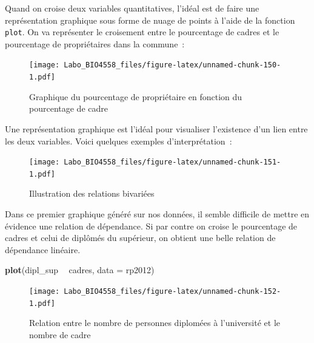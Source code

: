 \documentclass[12pt,]{book}
\newenvironment{Shaded}{\begin{snugshade}}{\end{snugshade}}
\newcommand{\DataTypeTok}[1]{\textcolor[rgb]{0.27,0.27,0.27}{#1}}
\newcommand{\KeywordTok}[1]{\textcolor[rgb]{0.27,0.27,0.27}{\textbf{#1}}}
\newcommand{\NormalTok}[1]{#1}
\newcommand{\OperatorTok}[1]{\textcolor[rgb]{0.43,0.43,0.43}{\textbf{#1}}}
\newcommand{\StringTok}[1]{\textcolor[rgb]{0.5,0.5,0.5}{#1}}
\begin{document}
Quand on croise deux variables quantitatives, l'idéal est de faire une représentation graphique sous forme de nuage de points à l'aide de la fonction \texttt{plot}. On va représenter le croisement entre le pourcentage de cadres et le pourcentage de propriétaires dans la commune~:

\begin{Shaded}
\end{Shaded}

\begin{figure}
\centering
\texttt{[image: Labo\_BIO4558\_files/figure-latex/unnamed-chunk-150-1.pdf]}
\caption{\label{fig:unnamed-chunk-150}Graphique du pourcentage de propriétaire en fonction du pourcentage de cadre}
\end{figure}

Une représentation graphique est l'idéal pour visualiser l'existence d'un lien entre les deux variables. Voici quelques exemples d'interprétation~:

\begin{figure}
\centering
\texttt{[image: Labo\_BIO4558\_files/figure-latex/unnamed-chunk-151-1.pdf]}
\caption{\label{fig:unnamed-chunk-151}Illustration des relations bivariées}
\end{figure}

Dans ce premier graphique généré sur nos données, il semble difficile de mettre en évidence une relation de dépendance. Si par contre on croise le pourcentage de cadres et celui de diplômés du supérieur, on obtient une belle relation de dépendance linéaire.

\begin{Shaded}
\begin{Highlighting}[]
\KeywordTok{plot}\NormalTok{(dipl_sup }\OperatorTok{~}\StringTok{ }\NormalTok{cadres, }\DataTypeTok{data =}\NormalTok{ rp2012)}
\end{Highlighting}
\end{Shaded}

\begin{figure}
\centering
\texttt{[image: Labo\_BIO4558\_files/figure-latex/unnamed-chunk-152-1.pdf]}
\caption{\label{fig:unnamed-chunk-152}Relation entre le nombre de personnes diplomées à l'université et le nombre de cadre}
\end{figure}
\end{document}
